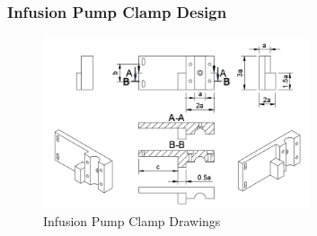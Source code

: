 \subsubsection{Infusion Pump Clamp Design}

\begin{figure}
    \centering
    \includegraphics[width=0.7\textwidth]{Figures/SupportDrawings/inf_pump_clamp_drawing.png}
    \caption{Infusion Pump Clamp Drawings}
    \label{fig:infpumpclampdrawing}
  \end{figure}